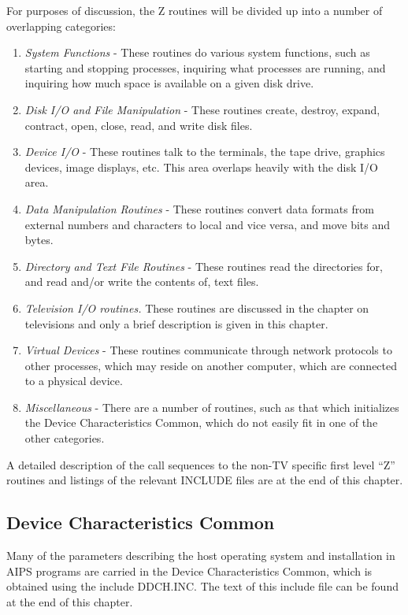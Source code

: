For purposes of discussion, the Z routines will be divided up into a
number of overlapping categories:
\begin{enumerate} %
\item {\it System Functions}  - These routines do various system functions,
such as starting and stopping processes, inquiring what processes are
running, and inquiring how much space is available on a given disk
drive.
\item {\it Disk I/O and File Manipulation}  - These routines create, destroy,
expand, contract, open, close, read, and write disk files.
\item {\it Device I/O}  - These routines talk to the terminals, the tape drive,
graphics devices, image displays, etc.  This area overlaps heavily
with the disk I/O area.
\item {\it Data Manipulation Routines}  - These routines convert data formats
from external numbers and characters to local and vice versa,
and move bits and bytes.
\item {\it Directory and Text File Routines}  - These routines read the
directories for, and read and/or write the contents of, text files.
\item {\it Television I/O routines.}   These routines are discussed in the
chapter on televisions and only a brief description is given in this
chapter.
\item {\it Virtual Devices} - These routines communicate through
network protocols to other processes, which may reside on another
computer, which are connected to a physical device.
\item {\it Miscellaneous}  - There are a number of routines, such as that which
initializes the Device Characteristics Common, which do not easily fit
in one of the other categories.
\end{enumerate} %
A detailed description of the call sequences to the non-TV specific
first level ``Z'' routines
and listings of the relevant INCLUDE files are at the end of this
chapter.

\subsection{Device Characteristics Common }

Many of the parameters describing the host operating system and
installation in AIPS programs are carried in the Device
Characteristics Common, which is obtained using the include
DDCH.INC.  The text of this include file can be found
at the end of this chapter.

